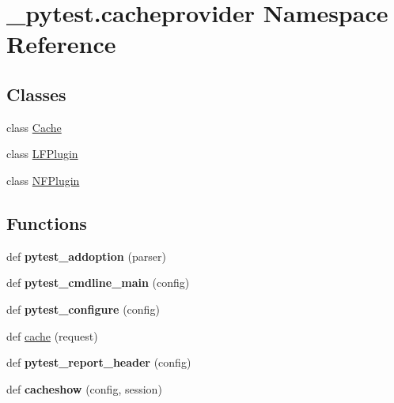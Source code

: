 \hypertarget{namespace__pytest_1_1cacheprovider}{}\section{\+\_\+pytest.\+cacheprovider Namespace Reference}
\label{namespace__pytest_1_1cacheprovider}
\subsection*{Classes}
\begin{DoxyCompactItemize}
\item 
class \hyperlink{class__pytest_1_1cacheprovider_1_1_cache}{Cache}
\item 
class \hyperlink{class__pytest_1_1cacheprovider_1_1_l_f_plugin}{L\+F\+Plugin}
\item 
class \hyperlink{class__pytest_1_1cacheprovider_1_1_n_f_plugin}{N\+F\+Plugin}
\end{DoxyCompactItemize}
\subsection*{Functions}
\begin{DoxyCompactItemize}
\item 
\mbox{\label{namespace__pytest_1_1cacheprovider_a1de97893cc0a0a3809aa19933395e5e7}} 
def {\bfseries pytest\+\_\+addoption} (parser)
\item 
\mbox{\label{namespace__pytest_1_1cacheprovider_a88c94d8977ff7650d0fa6d1897c243b9}} 
def {\bfseries pytest\+\_\+cmdline\+\_\+main} (config)
\item 
\mbox{\label{namespace__pytest_1_1cacheprovider_a262b5e9e707fc06406b855366654bc11}} 
def {\bfseries pytest\+\_\+configure} (config)
\item 
def \hyperlink{namespace__pytest_1_1cacheprovider_af7069bb3796bc249738fb0b0adea69ad}{cache} (request)
\item 
\mbox{\label{namespace__pytest_1_1cacheprovider_ae9f8cb7ff924a0bc5f0f310e6c2824df}} 
def {\bfseries pytest\+\_\+report\+\_\+header} (config)
\item 
\mbox{\label{namespace__pytest_1_1cacheprovider_adec3487856be2610dbc1a7365fb8f76d}} 
def {\bfseries cacheshow} (config, session)
\end{DoxyCompactItemize}
